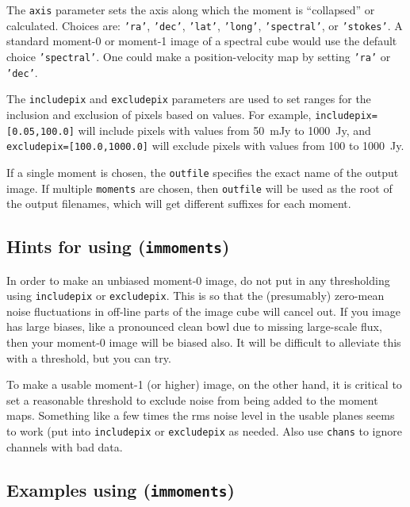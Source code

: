 The {\tt axis} parameter sets the axis along which the moment is
``collapsed'' or calculated.  Choices are: 
{\tt 'ra'}, {\tt 'dec'}, {\tt 'lat'}, {\tt 'long'}, {\tt 'spectral'},
or {\tt 'stokes'}.  A standard moment-0 or moment-1 image of
a spectral cube would use the default choice {\tt 'spectral'}.
One could make a position-velocity map by setting {\tt 'ra'} or 
{\tt 'dec'}.

The {\tt includepix} and {\tt excludepix} parameters are used to set
ranges for the inclusion and exclusion of pixels based on values.
For example, {\tt includepix=[0.05,100.0]} will include pixels
with values from 50~mJy to 1000~Jy, and 
{\tt excludepix=[100.0,1000.0]} will exclude pixels with values
from 100 to 1000~Jy.

If a single moment is chosen, the {\tt outfile} specifies the exact
name of the output image.  If multiple {\tt moments} are chosen,
then {\tt outfile} will be used as the root of the output filenames,
which will get different suffixes for each moment.  

\subsection{Hints for using ({\tt immoments})}
\label{section:analysis.moments.hints}

In order to make an unbiased moment-0 image, do not put in 
any thresholding using {\tt includepix} or {\tt excludepix}.
This is so that the (presumably) zero-mean noise fluctuations
in off-line parts of the image cube will cancel out.  If you
image has large biases, like a pronounced clean bowl due to
missing large-scale flux, then your moment-0 image will be biased
also.  It will be difficult to alleviate this with a threshold,
but you can try.

To make a usable moment-1 (or higher) image, on the other hand,
it is critical to set a
reasonable threshold to exclude noise from being added to the
moment maps.  Something like a few times the rms noise level
in the usable planes seems to work (put into {\tt includepix}
or {\tt excludepix} as needed.  Also use {\tt chans} to ignore
channels with bad data.

\subsection{Examples using ({\tt immoments})}
\label{section:analysis.moments.example}

